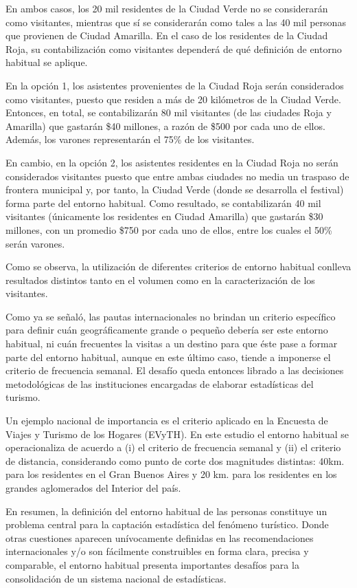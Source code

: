 \documentclass[
  openany]{book}
\begin{document}
En ambos casos, los 20 mil residentes de la Ciudad Verde no se considerarán como visitantes, mientras que sí se considerarán como tales a las 40 mil personas que provienen de Ciudad Amarilla. En el caso de los residentes de la Ciudad Roja, su contabilización como visitantes dependerá de qué definición de entorno habitual se aplique.

En la opción 1, los asistentes provenientes de la Ciudad Roja serán considerados como visitantes, puesto que residen a más de 20 kilómetros de la Ciudad Verde. Entonces, en total, se contabilizarán 80 mil visitantes (de las ciudades Roja y Amarilla) que gastarán \$40 millones, a razón de \$500 por cada uno de ellos. Además, los varones representarán el 75\% de los visitantes.

En cambio, en la opción 2, los asistentes residentes en la Ciudad Roja no serán considerados visitantes puesto que entre ambas ciudades no media un traspaso de frontera municipal y, por tanto, la Ciudad Verde (donde se desarrolla el festival) forma parte del entorno habitual. Como resultado, se contabilizarán 40 mil visitantes (únicamente los residentes en Ciudad Amarilla) que gastarán \$30 millones, con un promedio \$750 por cada uno de ellos, entre los cuales el 50\% serán varones.

Como se observa, la utilización de diferentes criterios de entorno habitual conlleva resultados distintos tanto en el volumen como en la caracterización de los visitantes.

Como ya se señaló, las pautas internacionales no brindan un criterio específico para definir cuán geográficamente grande o pequeño debería ser este entorno habitual, ni cuán frecuentes la visitas a un destino para que éste pase a formar parte del entorno habitual, aunque en este último caso, tiende a imponerse el criterio de frecuencia semanal. El desafío queda entonces librado a las decisiones metodológicas de las instituciones encargadas de elaborar estadísticas del turismo.

Un ejemplo nacional de importancia es el criterio aplicado en la Encuesta de Viajes y Turismo de los Hogares (EVyTH). En este estudio el entorno habitual se operacionaliza de acuerdo a (i) el criterio de frecuencia semanal y (ii) el criterio de distancia, considerando como punto de corte dos magnitudes distintas: 40km. para los residentes en el Gran Buenos Aires y 20 km. para los residentes en los grandes aglomerados del Interior del país.

En resumen, la definición del entorno habitual de las personas constituye un problema central para la captación estadística del fenómeno turístico. Donde otras cuestiones aparecen unívocamente definidas en las recomendaciones internacionales y/o son fácilmente construibles en forma clara, precisa y comparable, el entorno habitual presenta importantes desafíos para la consolidación de un sistema nacional de estadísticas.
\end{document}
